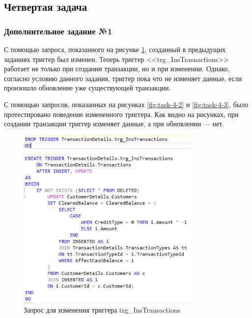 \documentclass[a4paper, 14pt]{extarticle}
\begin{document}
\subsection{Четвертая задача}

\subsubsection{Дополнительное задание №1}

С помощью запроса, показанного на рисунке \ref{fig:task-4-1}, созданный в
предыдущих заданиях триггер был изменен. Теперь триггер
<<\foreignlanguage{english}{trg\_InsTrasnactions}>> работает не только при
создании транзакции, но и при изменении. Однако, согласно условию данного
задания, триггер пока что не изменяет данные, если произошло обновление уже
существующей транзакции.

С помощью запросов, показанных на рисунках \ref{fig:task-4-2} и
\ref{fig:task-4-3}, было протестировано поведение измененного триггера. Как
видно на рисунках, при создании транзакции триггер изменяет данные, а при
обновлении --- нет.

\begin{figure}[H]
  \centering
  \includegraphics[width=0.8\textwidth]{images/task-4/1.png}
  \caption{
    Запрос для изменения триггера
    \foreignlanguage{english}{trg\_InsTransactions}
  }
  \label{fig:task-4-1}
\end{figure}
\end{document}

